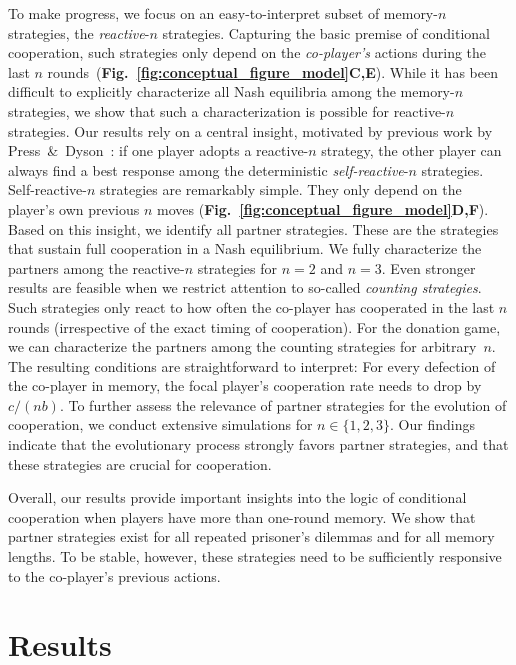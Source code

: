 \documentclass[11pt]{article}
\newcommand{\figurref}[1]{{\textbf{Fig.~\ref{#1}}}}
\begin{document}
To make progress, we focus on an easy-to-interpret subset of memory-$n$ strategies, the {\it reactive}-$n$ strategies. 
Capturing the basic premise of conditional cooperation, such strategies only depend on the {\it co-player's} actions during the last $n$ rounds~(\figurref{fig:conceptual_figure_model}\textbf{C,E}). 
While it has been difficult to explicitly characterize all Nash equilibria among the memory-$n$ strategies, we show that such a characterization is possible for reactive-$n$ strategies. 
Our results rely on a central insight, motivated by previous work by Press~\&~Dyson~\citep{press:PNAS:2012}: 
if one player adopts a reactive-$n$ strategy, the other player can always find a best response among the deterministic {\it self-reactive}-$n$ strategies. 
Self-reactive-$n$ strategies are remarkably simple. 
They only depend on the player's own previous $n$ moves (\figurref{fig:conceptual_figure_model}\textbf{D,F}).
Based on this insight, we identify all partner strategies. 
These are the strategies that sustain full cooperation in a Nash equilibrium. 
We fully characterize the partners among the reactive-$n$ strategies for $n\!=\!2$ and $n\!=\!3$.
Even stronger results are feasible when we restrict attention to so-called {\it counting strategies}.  
Such strategies only react to how often the co-player has cooperated in the last $n$ rounds (irrespective of the exact timing of cooperation). 
For the donation game, we can characterize the partners among the counting strategies for arbitrary~$n$. 
The resulting conditions are straightforward to interpret:
For every defection of the co-player in memory, the focal player's cooperation rate needs to drop by $c/(nb)$.
To further assess the relevance of partner strategies for the evolution of cooperation, we conduct extensive simulations for $n\!\in\!\{1,2,3\}$. 
Our findings indicate that the evolutionary process strongly favors partner strategies, and that these strategies are crucial for cooperation. 

Overall, our results provide important insights into the logic of conditional cooperation when players have more than one-round memory. 
We show that partner strategies exist for all repeated prisoner's dilemmas and for all memory lengths. 
To be stable, however, these strategies need to be sufficiently responsive to the co-player's previous actions. 

\section*{Results}
\end{document}
